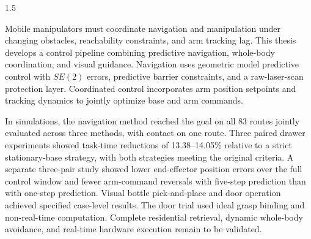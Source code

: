 \begin{abstracten}
\begin{spacing}{1.5}

Mobile manipulators must coordinate navigation and manipulation under changing obstacles, reachability constraints, and arm tracking lag. This thesis develops a control pipeline combining predictive navigation, whole-body coordination, and visual guidance. Navigation uses geometric model predictive control with \(SE(2)\) errors, predictive barrier constraints, and a raw-laser-scan protection layer. Coordinated control incorporates arm position setpoints and tracking dynamics to jointly optimize base and arm commands.

In simulations, the navigation method reached the goal on all 83 routes jointly evaluated across three methods, with contact on one route. Three paired drawer experiments showed task-time reductions of 13.38--14.05\% relative to a strict stationary-base strategy, with both strategies meeting the original criteria. A separate three-pair study showed lower end-effector position errors over the full control window and fewer arm-command reversals with five-step prediction than with one-step prediction. Visual bottle pick-and-place and door operation achieved specified case-level results. The door trial used ideal grasp binding and non-real-time computation. Complete residential retrieval, dynamic whole-body avoidance, and real-time hardware execution remain to be validated.

\end{spacing}
\end{abstracten}
